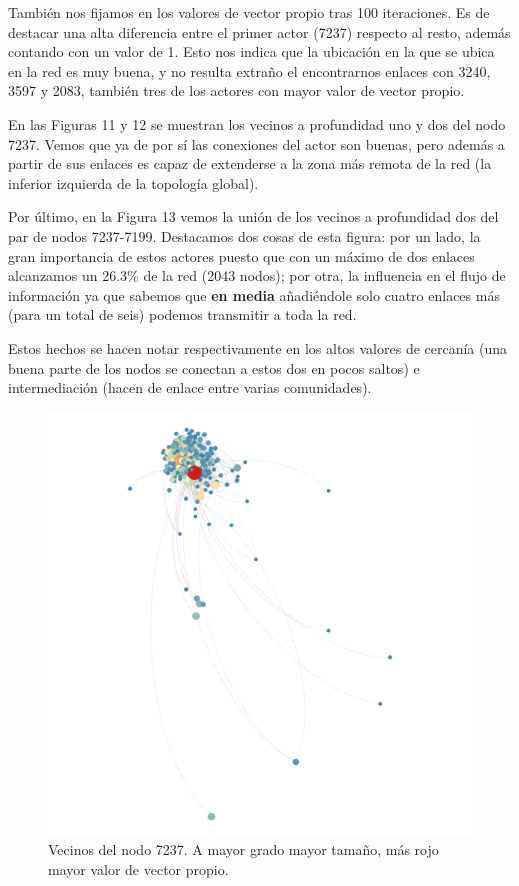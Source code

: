 También nos fijamos en los valores de vector propio tras 100 iteraciones. Es de destacar una alta diferencia entre el primer actor (7237) respecto al resto, además contando con un valor de 1. Esto nos indica que la ubicación en la que se ubica en la red es muy buena, y no resulta extraño el encontrarnos enlaces con 3240, 3597 y 2083, también tres de los actores con mayor valor de vector propio.

\vspace{\baselineskip}

En las Figuras 11 y 12 se muestran los vecinos a profundidad uno y dos del nodo 7237. Vemos que ya de por sí las conexiones del actor son buenas, pero además a partir de sus enlaces es capaz de extenderse a la zona más remota de la red (la inferior izquierda de la topología global).

\vspace{\baselineskip}

Por último, en la Figura 13 vemos la unión de los vecinos a profundidad dos del par de nodos 7237-7199. Destacamos dos cosas de esta figura: por un lado, la gran importancia de estos actores puesto que con un máximo de dos enlaces alcanzamos un 26.3\% de la red (2043 nodos); por otra, la influencia en el flujo de información ya que sabemos que \textbf{en media} añadiéndole solo cuatro enlaces más (para un total de seis) podemos transmitir a toda la red.

Estos hechos se hacen notar respectivamente en los altos valores de cercanía (una buena parte de los nodos se conectan a estos dos en pocos saltos) e intermediación (hacen de enlace entre varias comunidades). 

\begin{figure}[H]
    \centerfloat
    \includegraphics[width=1.3\textwidth]{img/resultados/grado-vector7237.png}
    \caption{Vecinos del nodo 7237. A mayor grado mayor tamaño, más rojo mayor valor de vector propio.}
\end{figure}

